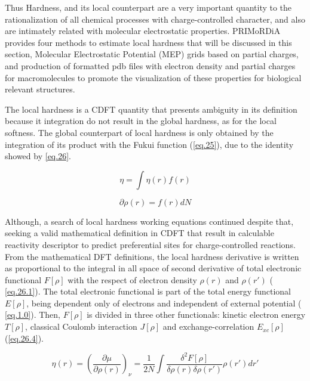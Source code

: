 \documentclass[a4paper,11pt]{refart}
\begin{document}
Thus Hardness, and its local counterpart are a very important quantity to the rationalization of all chemical processes with charge-controlled character, and also are intimately related with molecular electrostatic properties. PRIMoRDiA provides four methods to estimate local hardness that will be discussed in this section, Molecular Electrostatic Potential (MEP) grids based on partial charges, and production of formatted pdb files with electron density and partial charges for macromolecules to promote the visualization of these properties for biological relevant structures.

The local hardness is a CDFT quantity that presents ambiguity in its definition because it integration do not result in the global hardness, as for the local softness. The global counterpart of local hardness is only obtained by the integration of its product with the Fukui function (\autoref{eq.25}), due to the identity showed by \autoref{eq.26}. 

\begin{equation}
\eta = \int \eta(r) f(r)
\label{eq.25}
\end{equation}

\begin{equation}
\partial \rho(r) = f(r)dN
\label{eq.26}
\end{equation}

Although, a search of local hardness working equations continued despite that, seeking a valid mathematical definition in CDFT that result in calculable reactivity descriptor to predict preferential sites for charge-controlled reactions. From the mathematical DFT definitions, the local hardness derivative is written as proportional to the integral in all space of second derivative of total electronic functional $F[\rho]$ with the respect of electron density $\rho(r)$ and $\rho(r')$ ( \autoref{eq.26.1}). The total electronic functional is part of the total energy functional $E[\rho]$, being dependent only of electrons and independent of external potential ( \autoref{eq.1.0}).
Then,   $F[\rho]$ is divided in three other functionals: kinetic electron energy $T[\rho]$, classical Coulomb interaction $J[\rho]$ and  exchange-correlation $E_{xc}[\rho]$ (\autoref{eq.26.4}).

\begin{equation}
\eta(r) = \left( \frac{\partial \mu}{\partial \rho(r) } \right)_\nu = \frac{1}{2N} \int \frac{\delta^2 F[\rho]}{\delta \rho(r) \delta \rho(r')} \rho(r')dr'
\label{eq.26.1}
\end{equation}
\end{document}
